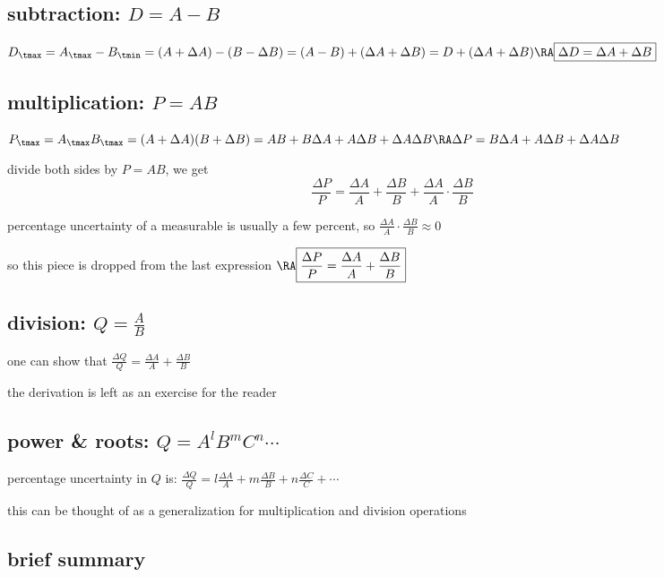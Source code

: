 \subsection*{subtraction: $D=A-B$}

$D_\tmax = A_\tmax - B_\tmin = (A + \Delta A) - (B - \Delta B) = (A-B) + (\Delta A + \Delta B)= D + (\Delta A + \Delta B) \RA \boxed{\Delta D = \Delta A + \Delta B}$

\subsection*{multiplication: $P=AB$}

$P_\tmax = A_\tmax B_\tmax = (A + \Delta A)(B + \Delta B) = AB + B\Delta A + A\Delta B + \Delta A \Delta B \RA \Delta P =  B\Delta A + A\Delta B + \Delta A \Delta B$

divide both sides by $P=AB$, we get
\begin{equation*}
\frac{\Delta P}{P} = \frac{\Delta A}{A} + \frac{\Delta B}{B} + \frac{\Delta A}{A}\cdot\frac{\Delta B}{B}
\end{equation*}

percentage uncertainty of a measurable is usually a few percent, so $\frac{\Delta A}{A}\cdot\frac{\Delta B}{B} \approx 0$

so this piece is dropped from the last expression $\RA \boxed{\frac{\Delta P}{P} = \frac{\Delta A}{A} + \frac{\Delta B}{B}}$

\subsection*{division: $Q=\frac{A}{B}$}

one can show that $\boxed{\frac{\Delta Q}{Q} = \frac{\Delta A}{A} + \frac{\Delta B}{B}}$

the derivation is left as an exercise for the reader

\subsection*{power \& roots: $Q=A^l B^m C^n\cdots$}

percentage uncertainty in $Q$ is: $\frac{\Delta Q}{Q} = l\frac{\Delta A}{A} + m\frac{\Delta B}{B} + n\frac{\Delta C}{C} +\cdots$

this can be thought of as a generalization for multiplication and division operations


\subsection*{brief summary}

